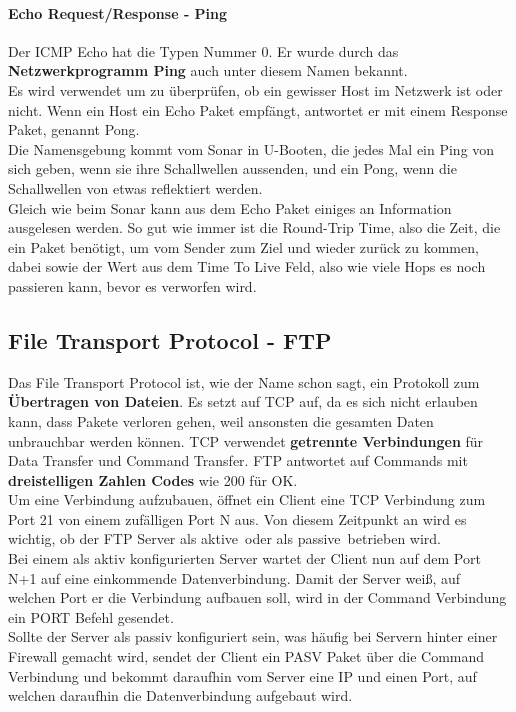 \documentclass[12pt,a4paper]{report}
\begin{document}
\begin{onehalfspace}
\paragraph{Echo Request/Response - Ping}
Der ICMP Echo hat die Typen Nummer 0. Er wurde durch das \textbf{Netzwerkprogramm Ping} auch unter diesem Namen bekannt.\\
Es wird verwendet um zu überprüfen, ob ein gewisser Host im Netzwerk ist oder nicht. Wenn ein Host ein Echo Paket empfängt, antwortet er mit einem Response Paket, genannt Pong.\\

Die Namensgebung kommt vom Sonar in U-Booten, die jedes Mal ein Ping von sich geben, wenn sie ihre Schallwellen aussenden, und ein Pong, wenn die Schallwellen von etwas reflektiert werden.\\ 
Gleich wie beim Sonar kann aus dem Echo Paket einiges an Information ausgelesen werden. So gut wie immer ist die Round-Trip Time, also die Zeit, die ein Paket benötigt, um vom Sender zum Ziel und wieder zurück zu kommen, dabei sowie der Wert aus dem Time To Live Feld, also wie viele Hops es noch passieren kann, bevor es verworfen wird.
\subsection{File Transport Protocol - FTP}
Das File Transport Protocol ist, wie der Name schon sagt, ein Protokoll zum \textbf{Übertragen von Dateien}. Es setzt auf TCP auf, da es sich nicht erlauben kann, dass Pakete verloren gehen, weil ansonsten die gesamten Daten unbrauchbar werden können. TCP verwendet \textbf{getrennte Verbindungen} für Data Transfer und Command Transfer. FTP antwortet auf Commands mit \textbf{dreistelligen Zahlen Codes} wie 200 für OK.\\

Um eine Verbindung aufzubauen, öffnet ein Client eine TCP Verbindung zum Port 21 von einem zufälligen Port N aus. Von diesem Zeitpunkt an wird es wichtig, ob der FTP Server als \glqq aktive\grqq \ oder als \glqq passive\grqq \ betrieben wird.\\
Bei einem als aktiv konfigurierten Server wartet der Client nun auf dem Port N+1 auf eine einkommende Datenverbindung. Damit der Server weiß, auf welchen Port er die Verbindung aufbauen soll, wird in der Command Verbindung ein PORT Befehl gesendet.\\
Sollte der Server als passiv konfiguriert sein, was häufig bei Servern hinter einer Firewall gemacht wird, sendet der Client ein PASV Paket über die Command Verbindung und bekommt daraufhin vom Server eine IP und einen Port, auf welchen daraufhin die Datenverbindung aufgebaut wird.\\


\end{onehalfspace}
\end{document}
